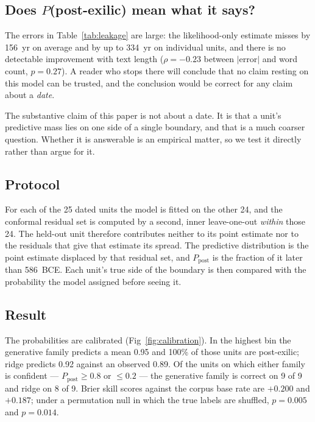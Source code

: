 \documentclass[10pt,letterpaper]{article}
\begin{document}
\subsection*{Does $P$(post-exilic) mean what it says?}
\label{sec:postexilic_cal}

The errors in Table~\ref{tab:leakage} are large: the likelihood-only estimate
misses by 156~yr on average and by up to 334~yr on individual units, and
there is no detectable improvement with text length
($\rho = -0.23$ between $|$error$|$ and word count, $p = 0.27$).  A reader
who stops there will conclude that no claim resting on this model can be
trusted, and the conclusion would be correct for any claim about a
\emph{date}.

The substantive claim of this paper is not about a date.  It is that a unit's
predictive mass lies on one side of a single boundary, and that is a much
coarser question.  Whether it is answerable is an empirical matter, so we
test it directly rather than argue for it.

\subsection*{Protocol}

For each of the 25 dated units the model is fitted on the other 24, and the
conformal residual set is computed by a second, inner leave-one-out
\emph{within} those 24.  The held-out unit therefore contributes neither to
its point estimate nor to the residuals that give that estimate its spread.
The predictive distribution is the point estimate displaced by that residual
set, and $P_{\text{post}}$ is the fraction of it later than 586~BCE.  Each
unit's true side of the boundary is then compared with the probability the
model assigned before seeing it.

\subsection*{Result}

The probabilities are calibrated (Fig~\ref{fig:calibration}).  In the
highest bin the generative family predicts a mean 0.95 and 100\% of those
units are post-exilic; ridge predicts 0.92 against an observed 0.89.  Of the
units on which either family is confident --- $P_{\text{post}} \geq 0.8$ or
$\leq 0.2$ --- the generative family is correct on 9 of 9 and ridge on 8 of
9.  Brier skill scores against the corpus base rate are $+0.200$ and
$+0.187$; under a permutation null in which the true labels are shuffled,
$p = 0.005$ and $p = 0.014$.
\end{document}
